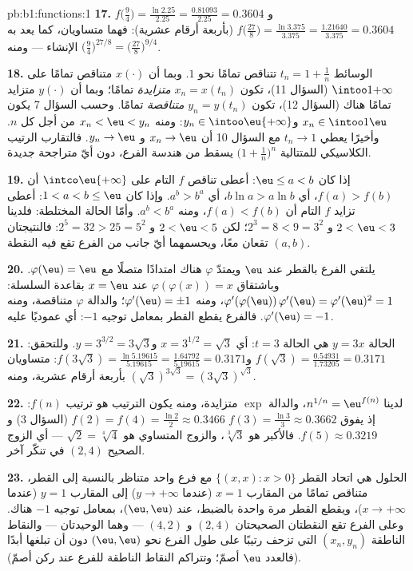 \begin{solution}{pb:b1:functions:1}
\textbf{17.} $f\bigl(\tfrac94\bigr) = \frac{\ln 2.25}{2.25} =
\frac{0.81093}{2.25} = 0.3604$ و$f\bigl(\tfrac{27}8\bigr) =
\frac{\ln 3.375}{3.375} = \frac{1.21640}{3.375} = 0.3604$ (بأربعة
أرقام عشرية): فهما متساويان، كما يعد به الإنشاء --- ومنه
$\bigl(\tfrac94\bigr)^{27/8} = \bigl(\tfrac{27}8\bigr)^{9/4}$.

\textbf{18.} الوسائط $t_n = 1 + \frac1n$ تتناقص تمامًا
نحو $1$. وبما أن $x(\cdot)$ متناقص تمامًا على
$\intoo1{+\infty}$ (السؤال 11)، تكون $x_n = x(t_n)$
\emph{متزايدة} تمامًا؛ وبما أن $y(\cdot)$ متزايد تمامًا هناك
(السؤال 12)، تكون $y_n = y(t_n)$ \emph{متناقصة} تمامًا. وحسب
السؤال 7 يكون $x_n \in \intoo1\eu$ و$y_n \in
\intoo\eu{+\infty}$: ومنه $x_n < \eu < y_n$ من أجل كل $n$. وأخيرًا يعطي
$t_n \to 1$ مع السؤال 10 أن $x_n \to \eu$ و $y_n \to \eu$.
فالتقارب الرتيب الكلاسيكي للمتتالية $\bigl(1 +
\frac1n\bigr)^n$ يسقط من هندسة الفرع، دون أيّ
متراجحة جديدة.

\textbf{19.} إذا كان $\eu \leq a < b$: أعطى تناقص $f$ التام على
$\intco\eu{+\infty}$ أن $f(a) > f(b)$، أي $b\ln a > a\ln
b$، أي $a^b > b^a$. وإذا كان $1 < a < b \leq \eu$: أعطى تزايد $f$
التام أن $f(a) < f(b)$، ومنه $a^b < b^a$. وأمّا الحالة المختلطة:
فلدينا $2 < \eu < 3$ و $2^3 = 8 < 9 = 3^2$؛ لكن $2 < \eu < 5$ و
$2^5 = 32 > 25 = 5^2$: فالنتيجتان تقعان معًا، ويحسمهما أيّ جانب
من الفرع تقع فيه النقطة $(a, b)$.

\textbf{20.} يلتقي الفرع بالقطر عند $\eu$ ويمتدّ $\varphi$
هناك امتدادًا متصلًا مع $\varphi(\eu) = \eu$.
وباشتقاق $\varphi(\varphi(x)) = x$ عند $x = \eu$ بقاعدة
السلسلة: $\varphi'(\varphi(\eu))\,\varphi'(\eu) =
\varphi'(\eu)^2 = 1$، ومنه $\varphi'(\eu) = \pm1$؛ والدالة $\varphi$
متناقصة، ومنه $\varphi'(\eu) = -1$. فالفرع يقطع
القطر بمعامل توجيه $-1$: أي عموديًا عليه.

\textbf{21.} الحالة $y = 3x$ هي الحالة $t = 3$: أي $x = 3^{1/2} = \sqrt3$
و$y = 3^{3/2} = 3\sqrt3$. وللتحقق: $f(\sqrt3) =
\frac{0.54931}{1.73205} = 0.3171$ و$f(3\sqrt3) =
\frac{\ln 5.19615}{5.19615} = \frac{1.64792}{5.19615} = 0.3171$:
متساويان بأربعة أرقام عشرية، ومنه $(\sqrt3)^{3\sqrt3} =
(3\sqrt3)^{\sqrt3}$.

\textbf{22.} لدينا $n^{1/n} = \eu^{f(n)}$، والدالة $\exp$ متزايدة، ومنه
يكون الترتيب هو ترتيب $f(n)$: إذ يفوق $f(3) = \frac{\ln3}3 \approx
0.3662$ $f(2) = f(4) = \frac{\ln2}2 \approx 0.3466$ (السؤال
3) و $f(5) \approx 0.3219$. فالأكبر هو $\sqrt[3]3$، والزوج
المتساوي هو $\sqrt2 = \sqrt[4]4$ --- أي الزوج الصحيح $(2, 4)$
في تنكّر آخر.

\textbf{23.}  الحلول هي اتحاد القطر $\{(x,
x) : x > 0\}$ مع فرع واحد متناظر بالنسبة إلى القطر،
متناقص تمامًا من المقارب $x = 1$ (عندما $y \to
+\infty$) إلى المقارب $y = 1$ (عندما $x \to +\infty$)، ويقطع
القطر مرة واحدة بالضبط، عند $(\eu, \eu)$، بمعامل توجيه $-1$
هناك. وعلى الفرع تقع النقطتان الصحيحتان $(2, 4)$ و $(4, 2)$
--- وهما الوحيدتان --- والنقاط الناطقة $(x_n, y_n)$
التي تزحف رتيبًا على طول الفرع نحو $(\eu, \eu)$
دون أن تبلغها أبدًا (فالعدد $\eu$ أصمّ؛ وتتراكم النقاط
الناطقة للفرع عند ركن أصمّ).


\end{solution}
